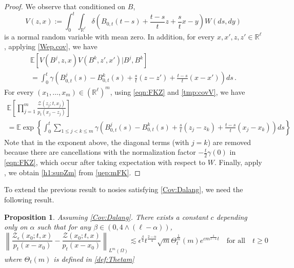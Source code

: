 \documentclass[12pt,reqno]{amsart}
\newtheorem{proposition}[theorem]{Proposition}
\theoremstyle{remark}
\newcommand{\1}{\mathbf{1}}
\def\RR{\mathbb{R}}
\def\EE{\mathbb{E}}
\def\Z{\mathcal{Z}}
\def\lt{\left}
\def\rt{\right}
\begin{document}
	\begin{proof}
		We observe that conditioned on $B$, 
		\begin{equation*}
		 	V(z,x):= \int_0^t\int_{\RR^\ell}\delta\left(B_{0,t}(t-s)+\frac{t-s}tz+\frac st x-y\right)W(ds,dy)
		\end{equation*} 
		is a normal random variable with mean zero. In addition, for every $x,x',z,z'\in\RR^\ell$, applying \eqref{Wep.cov}, we have
		\begin{multline}\label{tmp:covV}
			\EE\lt[V(B^j,z,x)V(B^k,z',x') \Big|B^j,B^k\rt] 
			\\= \int_0^t \gamma\lt(B_{0,t}^j(s)-B_{0,t}^k(s)+\frac st(z-z')+\frac{t-s}t(x-x') \rt)ds\,.
		\end{multline}  
		For every $(x_1,\dots,x_m)\in(\RR^\ell)^m$, using \eqref{eqn:FKZ} and \eqref{tmp:covV}, we have
		\begin{multline}\label{uep:mFK}
			\EE\left[\prod_{j=1}^m \frac{\Z(z_j;t,x_j)}{p_t(x_j-z_j)} \right]
			\\=  
			\EE\exp\left\{\int_0^t\sum_{1\le j<k\le m} \gamma\left(B_{0,t}^j(s)-B_{0,t}^k(s)+\frac st(z_j-z_k) +\frac{t-s}t(x_j-x_k)\right)ds\right\}
		\end{multline}
		Note that in the exponent above, the diagonal terms (with $j=k$) are removed because there are cancellations with the normalization factor $-\frac t2 \gamma(0)$ in \eqref{eqn:FKZ}, which occur after taking expectation with respect to $W$.
		Finally, apply \cite[Lemma 4.1] {HLN15}, we obtain \eqref{h1:supZm} from \eqref{uep:mFK}.
	\end{proof}
	To extend the previous result to nosies satisfying \ref{Cov:Dalang}, we need the following result.
	\begin{proposition}\label{prop:ZZep} Assuming \ref{Cov:Dalang}. There exists a constant $c$ depending only on $\alpha$ such that for any $\beta \in (0, 4\wedge (\ell -\alpha))$, 
		\begin{equation}
		\left\|\frac{\Z_{\epsilon}(x_0;t,x)}{p_t(x-x_0)} - \frac{\Z(x_0;t,x)}{p_t(x-x_0)} \right\|_{L^m(\Omega)}\lesssim  \epsilon^{\frac \beta4}t^{\frac{2- \alpha}4}\sqrt m \Theta_t^{\frac1m}(m)e^{cm^{\frac2{2- \alpha}}t}\quad\mbox{for all}\quad t\ge0
		\end{equation}
	where $\Theta_t(m)$ is defined in \eqref{def:Thetam}	
	\end{proposition}
\end{document}
